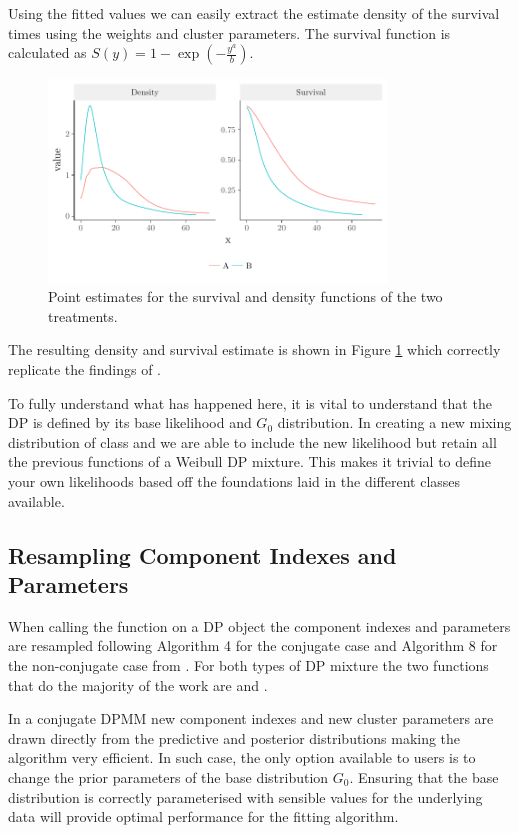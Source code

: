 \documentclass[nojss]{jss}
\begin{document}
Using the fitted values we can easily extract the estimate density of the survival times using the weights and cluster parameters. The survival function is calculated as $S(y) = 1 - \exp(- \frac{y ^a}{b})$.
\begin{figure}
\centering
\includegraphics[width=0.8\textwidth]{img/weibull_censor_graph.pdf}
\caption{Point estimates for the survival and density functions of the two treatments.}
\label{fig:weibull_cens}
\end{figure}
The resulting density and survival estimate is shown in Figure \ref{fig:weibull_cens} which correctly replicate the findings of \cite{kottas_nonparametric_2006}.

To fully understand what has happened here, it is vital to understand that the DP is defined by its base likelihood and $G_0$ distribution. In creating a new mixing distribution of class  and  we are able to include the new likelihood but retain all the previous functions of a Weibull DP mixture. This makes it trivial to define your own likelihoods based off the foundations laid in the different classes available.


\subsection{Resampling Component Indexes and Parameters}
When calling the  function on a DP object the component indexes and parameters are resampled following Algorithm 4 for the conjugate case and Algorithm 8 for the non-conjugate case from \cite{neal_markov_2000}. For both types of DP mixture the two functions that do the majority of the work are  and .

In a conjugate DPMM new component indexes and new cluster parameters are drawn directly from the predictive and posterior distributions making the algorithm very efficient. In such case, the only option available to users is to change the prior parameters of the base distribution $G_0$. Ensuring that the base distribution is correctly parameterised with sensible values for the underlying data will provide optimal performance for the fitting algorithm.
\end{document}
